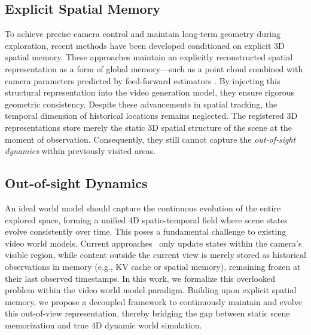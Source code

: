 \subsection{Explicit Spatial Memory}
To achieve precise camera control and maintain long-term geometry during exploration, recent methods \cite{spatia, vmem,hunyuanworld,hunyuanworld15,worldplay,spatialmem,epic,anchorweave} have been developed conditioned on explicit 3D spatial memory. These approaches maintain an explicitly reconstructed spatial representation as a form of global memory---such as a point cloud combined with camera parameters predicted by feed-forward estimators \cite{wang2025vggt,wang2024dust3r,wang2025continuous,depthanything3,keetha2026mapanything,stream3r2025}. By injecting this structural representation into the video generation model, they ensure rigorous geometric consistency.
Despite these advancements in spatial tracking, the temporal dimension of historical locations remains neglected. The registered 3D representations store merely the static 3D spatial structure of the scene at the moment of observation. Consequently, they still cannot capture the \textit{out-of-sight dynamics} within previously visited areas.

\vspace{-2.5mm}
\subsection{Out-of-sight Dynamics}
\vspace{-1mm}
An ideal world model should capture the continuous evolution of the entire explored space, forming a unified 4D spatio-temporal field where scene states evolve consistently over time. This poses a fundamental challenge to existing video world models. Current approaches~\cite{selfforcing, selfforcing++,longlive,rollingforcing,deepforcing,blockvid, contextasmemory,genie1,genie3,liveavatar, spatia, vmem,hunyuanworld,hunyuanworld15,worldplay,spatialmem,epic,anchorweave} only update states within the camera’s visible region, while content outside the current view is merely stored as historical observations in memory (e.g., KV cache or spatial memory), remaining frozen at their last observed timestamps. In this work, we formalize this overlooked problem within the video world model paradigm. Building upon explicit spatial memory, we propose a decoupled framework to continuously maintain and evolve this out-of-view representation, thereby bridging the gap between static scene memorization and true 4D dynamic world simulation.
